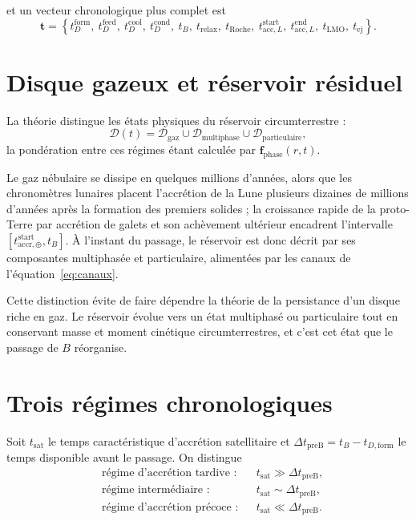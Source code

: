 \documentclass[11pt,a4paper,openany]{report}
\begin{document}
et un vecteur chronologique plus complet est
\begin{equation}
\mathbf{t}=\left\{t^{\mathrm{form}}_D,\ t^{\mathrm{feed}}_D,\ t^{\mathrm{cool}}_D,\
t^{\mathrm{cond}}_D,\ t_B,\ t_{\mathrm{relax}},\ t_{\mathrm{Roche}},\
t^{\mathrm{start}}_{\mathrm{acc},L},\ t^{\mathrm{end}}_{\mathrm{acc},L},\ t_{\mathrm{LMO}},\ t_{\mathrm{ej}}\right\}.
\label{eq:vecteur-t}
\end{equation}

\section{Disque gazeux et réservoir résiduel}

La théorie distingue les états physiques du réservoir circumterrestre :
\begin{equation}
\mathcal{D}(t)=\mathcal{D}_{\mathrm{gaz}}\cup\mathcal{D}_{\mathrm{multiphase}}\cup
\mathcal{D}_{\mathrm{particulaire}},
\label{eq:etats}
\end{equation}
la pondération entre ces régimes étant calculée par $\mathbf{f}_{\mathrm{phase}}(r,t)$.

Le gaz nébulaire se dissipe en quelques millions d'années, alors que les chronomètres lunaires
placent l'accrétion de la Lune plusieurs dizaines de millions d'années après la formation des
premiers solides ; la croissance rapide de la proto-Terre par accrétion de galets
\cite{Johansen2021} et son achèvement ultérieur encadrent l'intervalle
$[t^{\mathrm{start}}_{\mathrm{accr},\oplus},t_B]$. À l'instant du passage, le réservoir est donc
décrit par ses composantes multiphasée et particulaire, alimentées par les canaux de
l'équation~\eqref{eq:canaux}.

\begin{lecture}
Cette distinction évite de faire dépendre la théorie de la persistance d'un disque riche en gaz.
Le réservoir évolue vers un état multiphasé ou particulaire tout en conservant masse et moment
cinétique circumterrestres, et c'est cet état que le passage de $B$ réorganise.
\end{lecture}


\section{Trois régimes chronologiques}
\label{sec:regimes}

Soit $t_{\mathrm{sat}}$ le temps caractéristique d'accrétion satellitaire et
$\Delta t_{\mathrm{preB}}=t_B-t_{D,\mathrm{form}}$ le temps disponible avant le passage. On
distingue
\begin{align}
&\text{régime d'accrétion tardive :} && t_{\mathrm{sat}}\gg\Delta t_{\mathrm{preB}},
\label{eq:tardif}\\
&\text{régime intermédiaire :} && t_{\mathrm{sat}}\sim\Delta t_{\mathrm{preB}},
\label{eq:interm}\\
&\text{régime d'accrétion précoce :} && t_{\mathrm{sat}}\ll\Delta t_{\mathrm{preB}}.
\label{eq:precoce}
\end{align}
\end{document}
